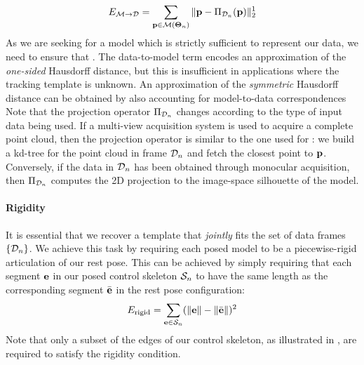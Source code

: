 \begin{DRAFT}
\begin{equation}
E_{\mathcal{M} \rightarrow \mathcal{D}} = \sum_{\mathbf{p} \in \mathcal{M}(\boldsymbol{\Theta}_n)} \| \mathbf{p} - \Pi_{\mathcal{D}_n}(\mathbf{p})\|_2^1
\label{eq:m2d}
\end{equation}
As we are seeking for a model which is strictly sufficient to represent our data, we need to ensure that  . 
The data-to-model term encodes an approximation of the \emph{one-sided} Hausdorff distance, but this is insufficient in applications where the tracking template is unknown. An approximation of the \emph{symmetric} Hausdorff distance can be obtained by also accounting for model-to-data correspondences
% 
Note that the projection operator $\Pi_{\mathcal{D}_n}$ changes according to the type of input data being used. If a multi-view acquisition system is used to acquire a complete point cloud, then the projection operator is similar to the one used for : we build a kd-tree for the point cloud in frame $\mathcal{D}_n$ and fetch the closest point to $\mathbf{p}$. Conversely, if the data in $\mathcal{D}_n$ has been obtained through monocular acquisition, then $\Pi_{\mathcal{D}_n}$ computes the 2D projection to the image-space silhouette of the model.
\end{DRAFT}

\paragraph{Rigidity}
It is essential that we recover a template that \emph{jointly} fits the set of data frames $\{ \mathcal{D}_n \}$. We achieve this task by requiring each posed model to be a piecewise-rigid articulation of our rest pose. This can be achieved by simply requiring that each segment $\mathbf{e}$ in our posed control skeleton $\mathcal{S}_n$ to have the same length as the corresponding segment $\bar{\mathbf{e}}$ in the rest pose configuration:
% 
\begin{equation}
E_{\text{rigid}} = \sum_{\mathbf{e} \in \mathcal{S}_n} (\| \mathbf{e} \| - \| \bar{\mathbf{e}} \|)^2
\end{equation}
% 
Note that only a subset of the edges of our control skeleton, as illustrated in , are required to satisfy the rigidity condition.

